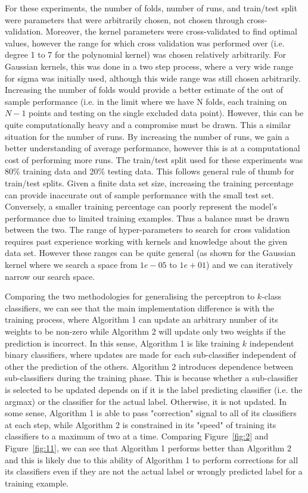 \documentclass[12pt]{article}
\begin{document}
For these experiments, the number of folds, number of runs, and train/test split were parameters that were arbitrarily chosen, not chosen through cross-validation. Moreover, the kernel parameters were cross-validated to find optimal values, however the range for which cross validation was performed over (i.e. degree 1 to 7 for the polynomial kernel) was chosen relatively arbitrarily. For Gaussian kernels, this was done in a two step process, where a very wide range for sigma was initially used, although this wide range was still chosen arbitrarily. Increasing the number of folds would provide a better estimate of the out of sample performance (i.e. in the limit where we have N folds, each training on $N-1$ points and testing on the single excluded data point). However, this can be quite computationally heavy and a compromise must be drawn. This a similar situation for the number of runs. By increasing the number of runs, we gain a better understanding of average performance, however this is at a computational cost of performing more runs. The train/test split used for these experiments was 80\% training data and 20\% testing data. This follows general rule of thumb for train/test splits. Given a finite data set size, increasing the training percentage can provide inaccurate out of sample performance with  the small test set. Conversely, a smaller training percentage can poorly represent the model's performance due to limited training examples. Thus a balance must be drawn between the two. The range of hyper-parameters to search for cross validation requires past experience working with kernels and knowledge about the given data set. However these ranges can be quite general (as shown for the Gaussian kernel where we search a space from $1e-05$ to $1e+01$) and we can iteratively narrow our search space.

Comparing the two methodologies for generalising the perceptron to $k$-class classifiers, we can see that the main implementation difference is with the training process, where Algorithm 1 can update an arbitrary number of its weights to be non-zero while Algorithm 2 will update only two weights if the prediction is incorrect. In this sense, Algorithm 1 is like training $k$ independent binary classifiers, where updates are made for each sub-classifier independent of other the prediction of the others. Algorithm 2 introduces dependence between sub-classifiers during the training phase. This is because whether a sub-classifier is selected to be updated depends on if it is the label predicting classifier (i.e. the argmax) or the classifier for the actual label. Otherwise, it is not updated. In some sense, Algorithm 1 is able to pass "correction" signal to all of its classifiers at each step, while Algorithm 2 is constrained in its "speed" of training its classifiers to a maximum of two at a time. Comparing Figure~\ref{fig:2} and Figure~\ref{fig:11}, we can see that Algorithm 1 performs better than Algorithm 2 and this is likely due to this ability of Algorithm 1 to perform corrections for all its classifiers even if they are not the actual label or wrongly predicted label for a training example.
\end{document}
